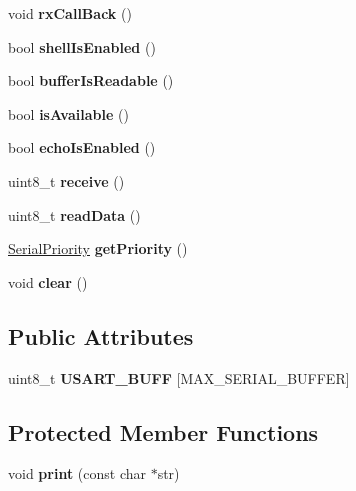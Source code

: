 \begin{DoxyCompactItemize}
\item 
\mbox{\label{classSerial_a2485ab59468bc39160fa72ba9a22c784}} 
void {\bfseries rx\+Call\+Back} ()
\item 
\mbox{\label{classSerial_a624ff162bdefdca9bcaedc3720137e1a}} 
bool {\bfseries shell\+Is\+Enabled} ()
\item 
\mbox{\label{classSerial_abe5d32f3ea45b75b8cf996b2054bc252}} 
bool {\bfseries buffer\+Is\+Readable} ()
\item 
\mbox{\label{classSerial_afc5602930c046d828392eb1eea31c045}} 
bool {\bfseries is\+Available} ()
\item 
\mbox{\label{classSerial_add2575d5d0352d7dbb4d5aff0c08df7e}} 
bool {\bfseries echo\+Is\+Enabled} ()
\item 
\mbox{\label{classSerial_a2acff37fe9102262032a3f8767204c52}} 
uint8\+\_\+t {\bfseries receive} ()
\item 
\mbox{\label{classSerial_a6453a654842a1b901bef5b789c38de65}} 
uint8\+\_\+t {\bfseries read\+Data} ()
\item 
\mbox{\label{classSerial_a4deaf90a27cb5d2d146ee7636ed1d025}} 
\hyperlink{serial_8h_aa8b6628780447bd68953ca27d2f1acd8}{Serial\+Priority} {\bfseries get\+Priority} ()
\item 
\mbox{\label{classSerial_a5348fa97c36cc7f5444252d952cbedde}} 
void {\bfseries clear} ()
\end{DoxyCompactItemize}
\subsection*{Public Attributes}
\begin{DoxyCompactItemize}
\item 
\mbox{\label{classSerial_a090daed60c890a076321d6bcd1c3ef0f}} 
uint8\+\_\+t {\bfseries U\+S\+A\+R\+T\+\_\+\+B\+U\+FF} \mbox{[}M\+A\+X\+\_\+\+S\+E\+R\+I\+A\+L\+\_\+\+B\+U\+F\+F\+ER\mbox{]}
\end{DoxyCompactItemize}
\subsection*{Protected Member Functions}
\begin{DoxyCompactItemize}
\item 
\mbox{\label{classSerial_a89295653be64224bbe1a11b572d9b0e4}} 
void {\bfseries print} (const char $\ast$str)
\end{DoxyCompactItemize}

